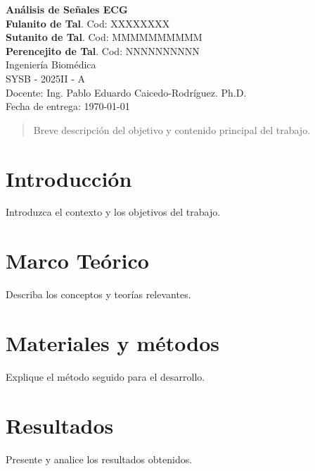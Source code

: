 \documentclass[12pt,a4paper]{article}
\newcommand{\tituloTrabajo}{Análisis de Señales ECG}
\newcommand{\autorA}{Fulanito de Tal}
\newcommand{\autorB}{Sutanito de Tal}
\newcommand{\autorC}{Perencejito de Tal}
\newcommand{\carrera}{Ingeniería Biomédica}
\newcommand{\codigoEstudianteA}{XXXXXXXX}
\newcommand{\codigoEstudianteB}{MMMMMMMMMM}
\newcommand{\codigoEstudianteC}{NNNNNNNNNN}
\newcommand{\cursoCodigo}{SYSB - 2025II - A} %
\newcommand{\docente}{Ing. Pablo Eduardo Caicedo-Rodríguez. Ph.D.}
\newcommand{\fechaEntrega}{\today}
\begin{document}
\thispagestyle{empty}
\begin{titlepage}
    \centering
    {\LARGE \textbf{\tituloTrabajo} \\
    }
    \vspace{2cm}
    {\large \textbf{\autorA}. Cod: \codigoEstudianteA} \\
    {\large \textbf{\autorB}. Cod: \codigoEstudianteB} \\
    {\large \textbf{\autorC}. Cod: \codigoEstudianteC} \\
    \vspace{1cm}
    {\large \carrera} \\
    \vspace{0.5cm}
    {\large \cursoCodigo{}} \\
    Docente: \docente \\
    \vfill
    Fecha de entrega: \fechaEntrega
\end{titlepage}


\tableofcontents
\newpage


\vspace{10cm}
\begin{abstract}
    Breve descripción del objetivo y contenido principal del trabajo.
\end{abstract}
\vfill

\newpage

\section{Introducción}
Introduzca el contexto y los objetivos del trabajo.

\section{Marco Teórico}
Describa los conceptos y teorías relevantes.

\section{Materiales y métodos}
Explique el método seguido para el desarrollo.

\section{Resultados}
Presente y analice los resultados obtenidos.
\end{document}
